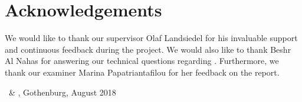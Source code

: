 \thispagestyle{plain}			%
\section*{Acknowledgements}
We would like to thank our supervisor Olaf Landsiedel for his invaluable support and continuous feedback during the project. We would also like to thank Beshr Al Nahas for answering our technical questions regarding \atwo{}. Furthermore, we thank our examiner Marina Papatriantafilou for her feedback on the report.

\vspace{1.5cm}
\hfill
\firstauthor\ \& \secondauthor, Gothenburg, August 2018

\newpage				%
\thispagestyle{empty}
\mbox{}